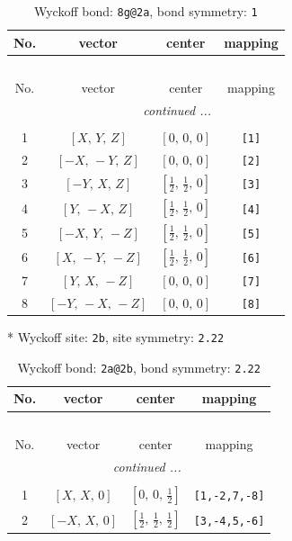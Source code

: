 \documentclass[fleqn,8pt]{jsarticle}
\begin{document}
\renewcommand{\arraystretch}{1.2}
\begin{longtable}{cccc}
\caption{Wyckoff bond: {\tt 8g@2a}, bond symmetry: {\tt 1}}
 \\
 \hline \hline
No. & vector & center & mapping \\ \hline \endfirsthead

\multicolumn{3}{l}{\tablename\ \thetable{}} \\
 \hline \hline
No. & vector & center & mapping \\ \hline \endhead

 \hline \hline
\multicolumn{3}{r}{\footnotesize\it continued ...} \\ \endfoot

 \hline \hline
\multicolumn{3}{r}{} \\ \endlastfoot

1 & $\left[ X,\, Y,\, Z \right]$ & $\left[ 0,\, 0,\, 0 \right]$ & {\tt [1]} \\ \hline
2 & $\left[ - X,\, - Y,\, Z \right]$ & $\left[ 0,\, 0,\, 0 \right]$ & {\tt [2]} \\ \hline
3 & $\left[ - Y,\, X,\, Z \right]$ & $\left[ \frac{1}{2},\, \frac{1}{2},\, 0 \right]$ & {\tt [3]} \\ \hline
4 & $\left[ Y,\, - X,\, Z \right]$ & $\left[ \frac{1}{2},\, \frac{1}{2},\, 0 \right]$ & {\tt [4]} \\ \hline
5 & $\left[ - X,\, Y,\, - Z \right]$ & $\left[ \frac{1}{2},\, \frac{1}{2},\, 0 \right]$ & {\tt [5]} \\ \hline
6 & $\left[ X,\, - Y,\, - Z \right]$ & $\left[ \frac{1}{2},\, \frac{1}{2},\, 0 \right]$ & {\tt [6]} \\ \hline
7 & $\left[ Y,\, X,\, - Z \right]$ & $\left[ 0,\, 0,\, 0 \right]$ & {\tt [7]} \\ \hline
8 & $\left[ - Y,\, - X,\, - Z \right]$ & $\left[ 0,\, 0,\, 0 \right]$ & {\tt [8]} \\
\end{longtable}
* Wyckoff site: {\tt 2b}, site symmetry: {\tt 2.22}
\renewcommand{\arraystretch}{1.2}
\begin{longtable}{cccc}
\caption{Wyckoff bond: {\tt 2a@2b}, bond symmetry: {\tt 2.22}}
 \\
 \hline \hline
No. & vector & center & mapping \\ \hline \endfirsthead

\multicolumn{3}{l}{\tablename\ \thetable{}} \\
 \hline \hline
No. & vector & center & mapping \\ \hline \endhead

 \hline \hline
\multicolumn{3}{r}{\footnotesize\it continued ...} \\ \endfoot

 \hline \hline
\multicolumn{3}{r}{} \\ \endlastfoot

1 & $\left[ X,\, X,\, 0 \right]$ & $\left[ 0,\, 0,\, \frac{1}{2} \right]$ & {\tt [1,-2,7,-8]} \\ \hline
2 & $\left[ - X,\, X,\, 0 \right]$ & $\left[ \frac{1}{2},\, \frac{1}{2},\, \frac{1}{2} \right]$ & {\tt [3,-4,5,-6]} \\
\end{longtable}
\end{document}
